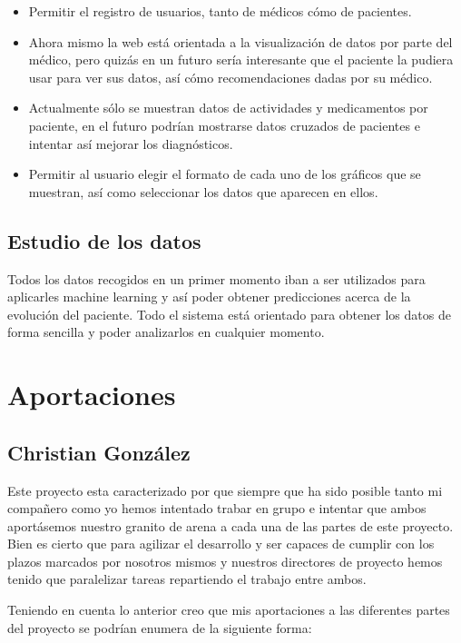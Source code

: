 \documentclass[11pt,spanish]{article}
\begin{document}
\begin{itemize}
	\item Permitir el registro de usuarios, tanto de médicos cómo de pacientes.
    \item Ahora mismo la web está orientada a la visualización de datos por parte del médico, pero quizás en un futuro sería interesante que el paciente la pudiera usar para ver sus datos, así cómo recomendaciones dadas por su médico.
    \item Actualmente sólo se muestran datos de actividades y medicamentos por paciente, en el futuro podrían mostrarse datos cruzados de pacientes e intentar así mejorar los diagnósticos.
    \item Permitir al usuario elegir el formato de cada uno de los gráficos que se muestran, así como seleccionar los datos que aparecen en ellos.
\end{itemize}

\subsection{Estudio de los datos}
Todos los datos recogidos en un primer momento iban a ser utilizados para aplicarles machine learning y así poder obtener predicciones acerca de la evolución del paciente. Todo el sistema está orientado para obtener los datos de forma sencilla y poder analizarlos en cualquier momento.
\newpage

\section{Aportaciones}
\subsection{Christian González}

Este proyecto esta caracterizado por que siempre que ha sido posible tanto mi compañero como yo hemos intentado trabar en grupo e intentar que ambos aportásemos nuestro granito de arena a cada una de las partes de este proyecto. Bien es cierto que para agilizar el desarrollo y ser capaces de cumplir con los plazos marcados por nosotros mismos y nuestros directores de proyecto hemos tenido que paralelizar tareas repartiendo el trabajo entre ambos.

Teniendo en cuenta lo anterior creo que mis aportaciones a las diferentes partes del proyecto se podrían enumera de la siguiente forma:
\end{document}

